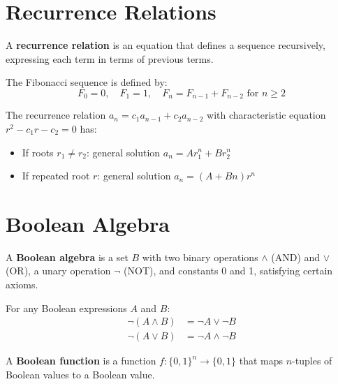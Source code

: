 \section{Recurrence Relations}

\begin{definition}
A \textbf{recurrence relation} is an equation that defines a sequence recursively, expressing each term in terms of previous terms.
\end{definition}

\begin{example}
The Fibonacci sequence is defined by:
\[F_0 = 0, \quad F_1 = 1, \quad F_n = F_{n-1} + F_{n-2} \text{ for } n \geq 2\]
\end{example}

\begin{theorem}
The recurrence relation $a_n = c_1 a_{n-1} + c_2 a_{n-2}$ with characteristic equation $r^2 - c_1 r - c_2 = 0$ has:
\begin{itemize}
    \item If roots $r_1 \neq r_2$: general solution $a_n = A r_1^n + B r_2^n$
    \item If repeated root $r$: general solution $a_n = (A + Bn) r^n$
\end{itemize}
\end{theorem}

\section{Boolean Algebra}

\begin{definition}
A \textbf{Boolean algebra} is a set $B$ with two binary operations $\land$ (AND) and $\lor$ (OR), a unary operation $\neg$ (NOT), and constants 0 and 1, satisfying certain axioms.
\end{definition}

\begin{theorem}
For any Boolean expressions $A$ and $B$:
\begin{align}
\neg(A \land B) &= \neg A \lor \neg B \\
\neg(A \lor B) &= \neg A \land \neg B
\end{align}
\end{theorem}

\begin{definition}
A \textbf{Boolean function} is a function $f: \{0,1\}^n \to \{0,1\}$ that maps $n$-tuples of Boolean values to a Boolean value.
\end{definition}

